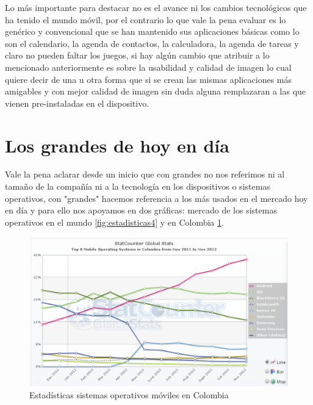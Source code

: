 \documentclass[11pt]{book}
\begin{document}
Lo más importante para destacar no es el avance ni los cambios tecnológicos que ha tenido el mundo móvil, por el contrario lo que vale la pena evaluar es lo genérico y convencional que se han mantenido sus aplicaciones básicas como lo son el calendario, la agenda de contactos, la calculadora, la agenda de tareas y claro no pueden faltar los juegos, si hay algún cambio que atribuir a lo mencionado anteriormente es sobre la usabilidad y calidad de imagen lo cual quiere decir de una u otra forma que si se crean las mismas aplicaciones más amigables y con mejor calidad de imagen sin duda alguna remplazaran a las que vienen pre-instaladas en el dispositivo.

\section{Los grandes de hoy en día}
Vale la pena aclarar desde un inicio que con grandes no nos referimos ni al tamaño de la compañía ni a la tecnología en los dispositivos o sistemas operativos, con "grandes" hacemos referencia a los más usados en el mercado hoy en día y para ello nos apoyamos en dos gráficas: mercado de los sistemas operativos en el mundo \ref{fig:estadisticas4} y en Colombia \ref{fig:estadisticas3}.


\begin{figure}[H]
  \centering
    \includegraphics[width=1.0\textwidth]{estadisticas_3}
  \caption{Estadísticas sistemas operativos móviles en Colombia}
  \label{fig:estadisticas3}
\end{figure}
\end{document}
